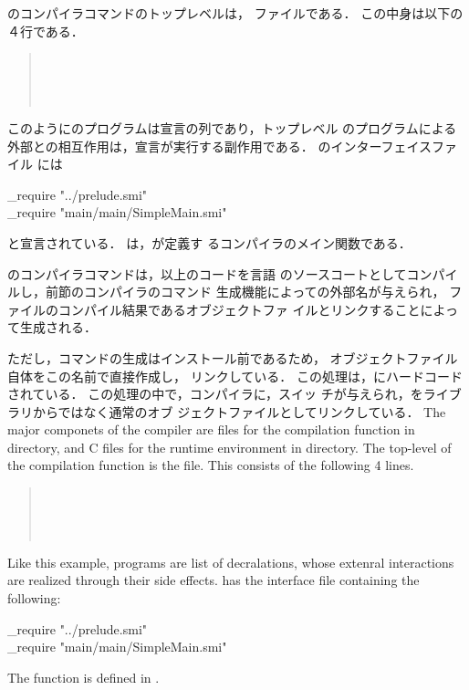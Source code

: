 	\smlsharp{}のコンパイラコマンドのトップレベルは，
ファイルである．
	この中身は以下の４行である．
\begin{quote}
\\
\\
\\
\end{quote}
	このように\smlsharp{}のプログラムは宣言の列であり，トップレベル
のプログラムによる外部との相互作用は，宣言が実行する副作用である．
	のインターフェイスファイル
には
\begin{program}
\_require "../prelude.smi"
\\
\_require "main/main/SimpleMain.smi"
\end{program}
と宣言されている．
	は，が定義す
るコンパイラのメイン関数である．

	\smlsharp{}のコンパイラコマンドは，以上のコードを\smlsharp{}言語
のソースコートとしてコンパイルし，前節の\smlsharp{}コンパイラのコマンド
生成機能によっての外部名が与えられ，
ファイルのコンパイル結果であるオブジェクトファ
イルとリンクすることによって生成される．

	ただし，\smlsharp{}コマンドの生成はインストール前であるため，
オブジェクトファイル自体をこの名前で直接作成し，
リンクしている．
	この処理は，にハードコードされている．
	この処理の中で，\smlsharp{}コンパイラに，スイッ
チが与えられ，をライブラリからではなく通常のオブ
ジェクトファイルとしてリンクしている．
\else%
	The major componets of the \smlsharp{} compiler are 
\smlsharp{} files for the compilation function in 
directory, and C files for the runtime environment in 
directory.
	The top-level of the \smlsharp{} compilation function is the
 file.
	This consists of the following 4 lines.
\begin{quote}
\\
\\
\\
\end{quote}
	Like this example, \smlsharp{} programs are list of
decralations, whose extenral interactions are realized through 
their side effects.
	 has the interface file
 containing the following:
\begin{program}
\_require "../prelude.smi"
\\
\_require "main/main/SimpleMain.smi"
\end{program}
	The  function is defined in
.


